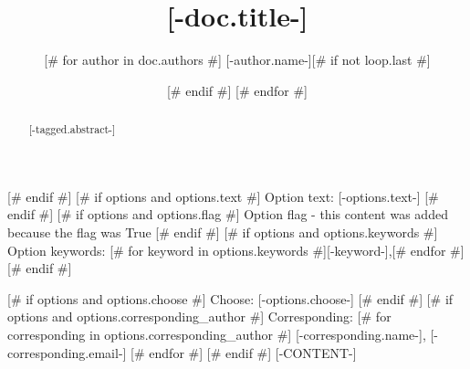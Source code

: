 \title{[-doc.title-]}
\author{[# for author in doc.authors #]
[-author.name-][# if not loop.last #] \and [# endif #]
[# endfor #]
}

\begin{abstract}
[-tagged.abstract-]
\end{abstract}
[# endif #]
[# if options and options.text #]
Option text: [-options.text-]
[# endif #]
[# if options and options.flag #]
Option flag - this content was added because the flag was True
[# endif #]
[# if options and options.keywords #]
Option keywords:
[# for keyword in options.keywords #][-keyword-],[# endfor #]
[# endif #]

[# if options and options.choose #]
Choose:
[-options.choose-]
[# endif #]
[# if options and options.corresponding_author #]
Corresponding:
[# for corresponding in options.corresponding_author #]
[-corresponding.name-], [-corresponding.email-]
[# endfor #]
[# endif #]
[-CONTENT-]
